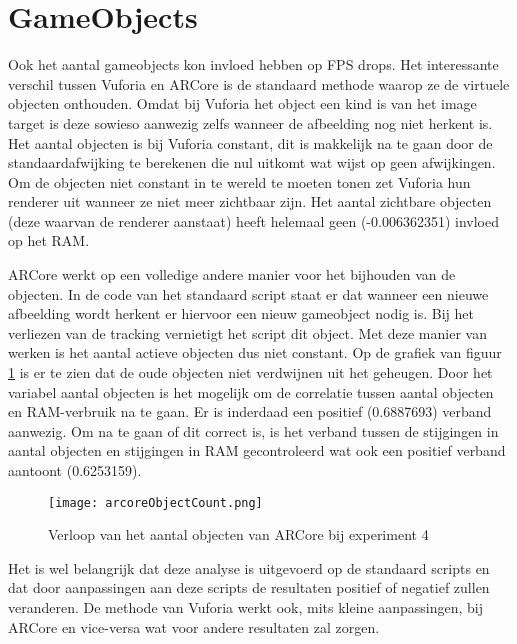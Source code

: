 \section{GameObjects}\label{sec:gameobjects}
Ook het aantal gameobjects kon invloed hebben op FPS drops. Het interessante verschil tussen Vuforia en ARCore is de standaard methode waarop ze de virtuele objecten onthouden. Omdat bij Vuforia het object een kind is van het image target is deze sowieso aanwezig zelfs wanneer de afbeelding nog niet herkent is. Het aantal objecten is bij Vuforia constant, dit is makkelijk na te gaan door de standaardafwijking te berekenen die nul uitkomt wat wijst op geen afwijkingen. Om de objecten niet constant in te wereld te moeten tonen zet Vuforia hun renderer uit wanneer ze niet meer zichtbaar zijn. Het aantal zichtbare objecten (deze waarvan de renderer aanstaat) heeft helemaal geen (-0.006362351) invloed op het RAM.

ARCore werkt op een volledige andere manier voor het bijhouden van de objecten. In de code van het standaard script staat er dat wanneer een nieuwe afbeelding wordt herkent er hiervoor een nieuw gameobject nodig is. Bij het verliezen van de tracking vernietigt het script dit object. Met deze manier van werken is het aantal actieve objecten dus niet constant. Op de grafiek van figuur \ref{fig:arcoreObjectCount} is er te zien dat de oude objecten niet verdwijnen uit het geheugen. Door het variabel aantal objecten is het mogelijk om de correlatie tussen aantal objecten en RAM-verbruik na te gaan. Er is inderdaad een positief (0.6887693) verband aanwezig. Om na te gaan of dit correct is, is het verband tussen de stijgingen in aantal objecten en stijgingen in RAM gecontroleerd wat ook een positief verband aantoont (0.6253159). 

\begin{figure}
    \texttt{[image: arcoreObjectCount.png]}
    \caption{Verloop van het aantal objecten van ARCore bij experiment 4}
    \label{fig:arcoreObjectCount}
\end{figure}

Het is wel belangrijk dat deze analyse is uitgevoerd op de standaard scripts en dat door aanpassingen aan deze scripts de resultaten positief of negatief zullen veranderen. De methode van Vuforia werkt ook, mits kleine aanpassingen, bij ARCore en vice-versa wat voor andere resultaten zal zorgen.

